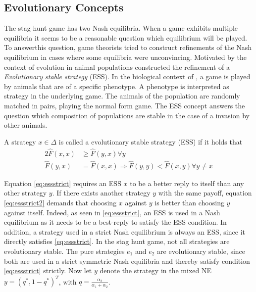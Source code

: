 \subsection{Evolutionary Concepts}
The stag hunt game has two Nash equilibria. When a game exhibits 
multiple equilibria it seems to be a reasonable question 
which equilibrium will be played. To answerthis question, 
game theorists tried to construct refinements 
of the Nash equilibrium in cases where some equilibria were unconvincing. 
Motivated by the context of evolution in animal populations 
\textcite{smith_lhe_1973} constructed the refinement of a 
\textit{Evolutionary stable strategy} (ESS).  
In the biological context of \textcite{smith_lhe_1973}, a game is played 
by animals that are of a specific phenotype. A phenotype is interpreted
as strategy in the underlying game. The animals of the population are randomly
matched in pairs, playing the normal form game. 
The ESS concept answers the question which composition of populations are
stable in the case of a invasion by other animals.
\begin{mydef}
        \label{def:ess}
        A strategy $x \in \Delta$ is called a evolutionary stable strategy 
        (ESS) if it holds that
        \begin{alignat}{2}
                \label{eq:essstrict}
                \hat{F}(x,x) &\geq \hat{F}(y,x) \forall y \\ 
                \hat{F}(y,x) &= \hat{F}(x,x) \Rightarrow  
                \hat{F}(y,y) < \hat{F}(x,y) \forall y \neq x \label{eq:essstrict2}
        \end{alignat}
\end{mydef}
Equation \eqref{eq:essstrict}
requires an ESS $x$ to be a better reply to itself than any other strategy $y$.
If there exists another strategy $y$ with the same payoff, equation 
\eqref{eq:essstrict2} demands that choosing $x$ against $y$ is better 
than choosing $y$ against itself.
Indeed, as seen in \eqref{eq:essstrict}, an ESS is used in a 
Nash equilibrium as it needs to be a best-reply to satisfy the 
ESS condition. In addition, a strategy used in a strict 
Nash equilibrium is always an ESS, since it directly satisfies 
\eqref{eq:essstrict}. 
In the stag hunt game, not all strategies are evolutionary stable.
The pure strategies $e_1$ and $e_2$ are evolutionary stable,
since both are used in a strict symmetric Nash equilibria and thereby 
satisfy condition \eqref{eq:essstrict} strictly. 
Now let $y$ denote the strategy in the mixed NE $y=(q^*,1-q^*)^T$, 
with $q=\frac{\alpha_2}{\alpha_1+\alpha_2}$.
